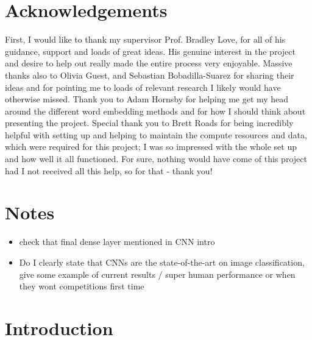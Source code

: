 \documentclass[12pt]{report}
\begin{document}
\chapter*{Acknowledgements}
\thispagestyle{empty}
First, I would like to thank my supervisor Prof. Bradley Love, for all of his guidance, support and loads of great ideas. His genuine interest in the project and desire to help out really made the entire process very enjoyable. Massive thanks also to Olivia Guest, and Sebastian Bobadilla-Suarez for sharing their ideas and for pointing me to loads of relevant research I likely would have otherwise missed. Thank you to Adam Hornsby for helping me get my head around the different word embedding methods and for how I should think about presenting the project. Special thank you to Brett Roads for being incredibly helpful with setting up and helping to maintain the compute resources and data, which were required for this project; I was so impressed with the whole set up and how well it all functioned. For sure, nothing would have come of this project had I not received all this help, so for that - thank you!

\clearpage

\tableofcontents
\listoffigures
\listoftables
\setcounter{page}{1}

\chapter{Notes}
\begin{itemize}
    \item check that final dense layer mentioned in CNN intro
    \item Do I clearly state that CNNs are the state-of-the-art on image classification, give some example of current results / super human performance or when they wont competitions first time
\end{itemize}

\chapter[Introduction]{Introduction\raisebox{.3\baselineskip}{\normalsize\footnotemark}}
\end{document}
